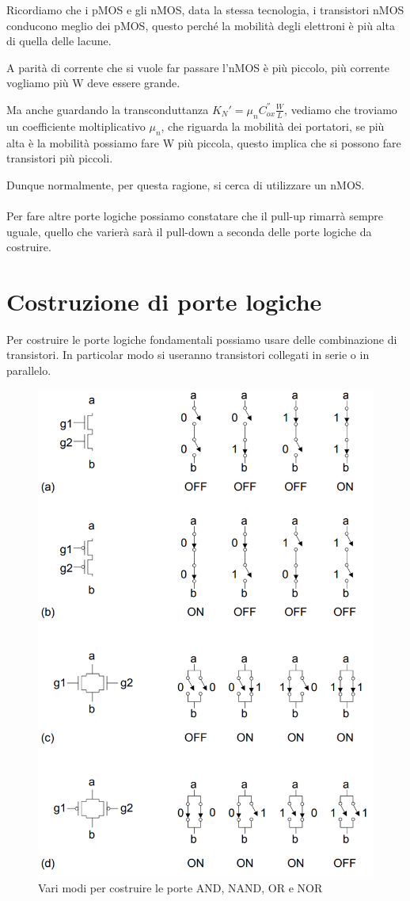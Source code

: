 Ricordiamo che i pMOS e gli nMOS, data la stessa tecnologia, i transistori nMOS conducono meglio dei pMOS, questo perché la mobilità degli elettroni è più alta di quella delle lacune.

A parità di corrente che si vuole far passare l'nMOS è più piccolo, più corrente vogliamo più W deve essere grande.

Ma anche guardando la transconduttanza $K_N' = \mu_nC_{ox}^{''}\frac{W}{L}$, vediamo che troviamo un coefficiente moltiplicativo $\mu_n$, che riguarda la mobilità dei portatori, se più alta è la mobilità possiamo fare W più piccola, questo implica che si possono fare transistori più piccoli.


Dunque normalmente, per questa ragione, si cerca di utilizzare un nMOS. 

\paragraph{}
Per fare altre porte logiche possiamo constatare che il pull-up rimarrà sempre uguale, quello che varierà sarà il pull-down a seconda delle porte logiche da costruire.


\newpage
\section{Costruzione di porte logiche}
Per costruire le porte logiche fondamentali possiamo usare delle combinazione di transistori. In particolar modo si useranno transistori collegati in serie o in parallelo.


\begin{figure}[htbp]
    \centering
    \includegraphics[width=0.5\linewidth]{img/and_or.png}
    \caption{Vari modi per costruire le porte AND, NAND, OR e NOR}  
    \label{and_or}
\end{figure}

